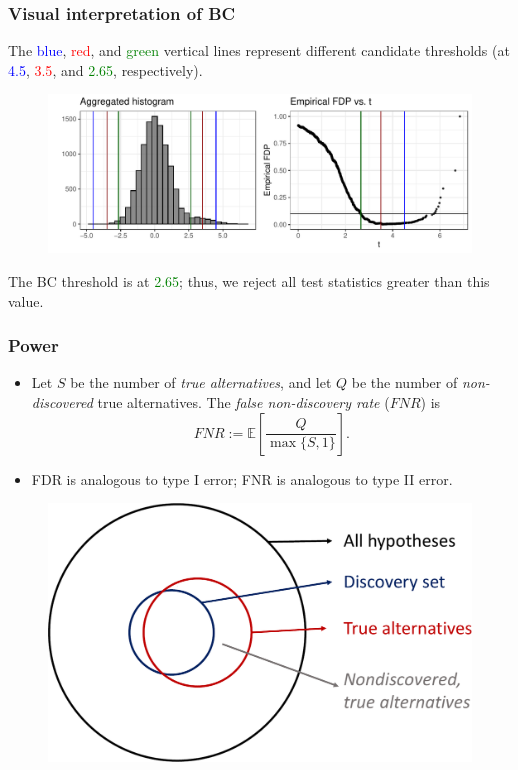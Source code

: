 \documentclass{beamer}
\begin{document}
\begin{frame}
\frametitle{Visual interpretation of BC}
The \textcolor{blue}{blue}, \textcolor{red}{red}, and \textcolor{green}{green} vertical lines represent different candidate thresholds (at \textcolor{blue}{4.5}, \textcolor{red}{3.5}, and \textcolor{green}{2.65}, respectively).
\begin{figure}
	\centering
	\includegraphics[width=1.0\linewidth]{agg_test_stats}
\end{figure}
The BC threshold is at \textcolor{green}{2.65}; thus, we reject all test statistics greater than this value.
\end{frame}

\begin{frame}
\frametitle{Power}

\begin{itemize}
\item Let $S$ be the number of \textit{true alternatives}, and let $Q$ be the number of \textit{non-discovered} true alternatives. The \textit{false non-discovery rate} ($FNR$) is 
$$FNR := \mathbb{E} \left[ \frac{Q}{ \max\{ S, 1 \} } \right].$$
\item FDR is analogous to type I error; FNR is analogous to type II error.

\end{itemize}
\begin{figure}
	\centering
	\includegraphics[width=0.6\linewidth]{fnr_crop}
	\label{fig:fnrcrop}
\end{figure}
\end{frame}
\end{document}
